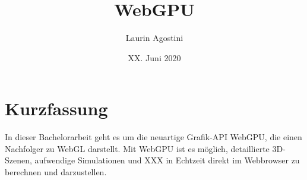 \documentclass[oneside]{ausarbeitung}
\begin{document}



\title{WebGPU}

\author{Laurin Agostini}

\date{XX. Juni 2020}

\maketitle
\cleardoublepage

\setcounter{page}{1}


\makeaffirmation
\cleardoublepage

\chapter*{Kurzfassung}
In dieser Bachelorarbeit geht es um die neuartige Grafik-API WebGPU, die einen Nachfolger zu WebGL darstellt. Mit WebGPU ist es möglich, detaillierte 3D-Szenen, aufwendige Simulationen und XXX in Echtzeit direkt im Webbrowser zu berechnen und darzustellen. 

\cleardoublepage
{}
\tableofcontents

\listoffigures

\listoftables

\lstlistoflistings

\end{document}
